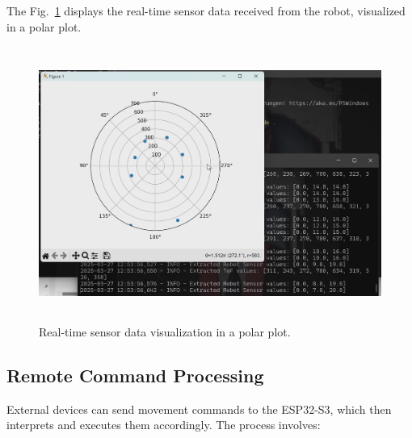 The Fig.~\ref{fig:live-data-streaming} displays the real-time sensor data received from the robot, visualized in a polar plot.
\begin{figure}[H]
	\centering
	\includegraphics[height=9cm]{assets/LiveDataStreaming.png}
	\caption{Real-time sensor data visualization in a polar plot.}
	\label{fig:live-data-streaming}
\end{figure}


\subsection{Remote Command Processing}External devices can send movement commands to the ESP32-S3, which then interprets and executes them accordingly. The process involves:

